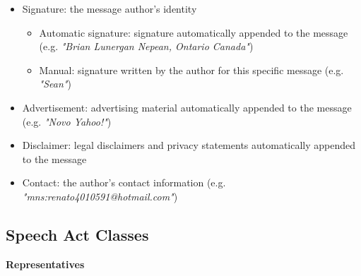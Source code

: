 \documentclass[11pt]{article}
\begin{document}
\begin{itemize}
	\item Signature: the message author's identity
		\begin{itemize}
			\item Automatic signature: signature automatically appended to the message (e.g. \textit{"Brian Lunergan Nepean, Ontario Canada"})
			\item Manual: signature written by the author for this specific message (e.g. \textit{"Sean"})
		\end{itemize}
	\item Advertisement: advertising material automatically appended to the message (e.g. \textit{"Novo Yahoo!"})
	\item Disclaimer: legal disclaimers and privacy statements automatically appended to the message
	\item Contact: the author's contact information (e.g. \textit{"mns:renato4010591@hotmail.com"})
\end{itemize}

\subsection{Speech Act Classes}
\label{subsec:speech_act_classes}

\textbf{Representatives}
\end{document}
